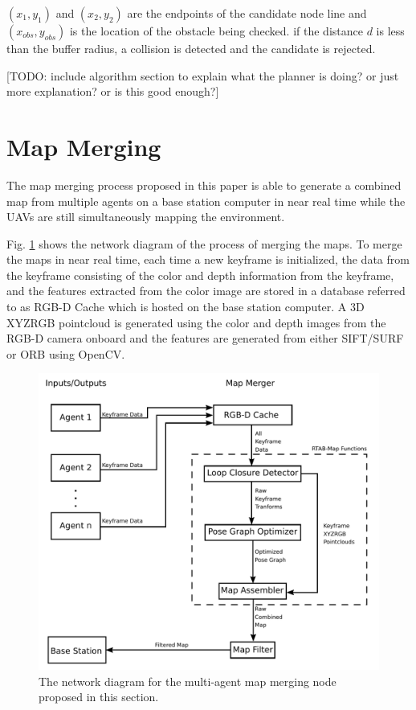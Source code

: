 \documentclass[letterpaper, 10 pt, conference]{ieeeconf}  %
\newcommand{\todo}[1]{{\color{blue}[TODO: #1]}}
\begin{document}
$(x_1,y_1)$ and $(x_2,y_2)$ are the endpoints of the candidate node line and $(x_{\mathit{obs}},y_{\mathit{obs}})$ is the location of the obstacle being checked. if the distance $d$ is less than the buffer radius, a collision is detected and the candidate is rejected.

\todo{include algorithm section to explain what the planner is doing? or just more explanation? or is this good enough?}

\section{Map Merging}\label{merge}

The map merging process proposed in this paper is able to generate a combined map from multiple agents on a base station computer in near real time while the UAVs are still simultaneously mapping the environment.

Fig. \ref{fig:map_merge} shows the network diagram of the process of merging the maps. To merge the maps in near real time, each time a new keyframe is initialized, the data from the keyframe consisting of the color and depth information from the keyframe, and the features extracted from the color image are stored in a database referred to as RGB-D Cache which is hosted on the base station computer. A 3D XYZRGB pointcloud is generated using the color and depth images from the RGB-D camera onboard and the features are generated from either SIFT/SURF or ORB using OpenCV.

\begin{figure}
\centering
\includegraphics[width=0.7\linewidth]{map_merger_network}
\caption{The network diagram for the multi-agent map merging node proposed in this section.}
\label{fig:map_merge}
\end{figure}
\end{document}
